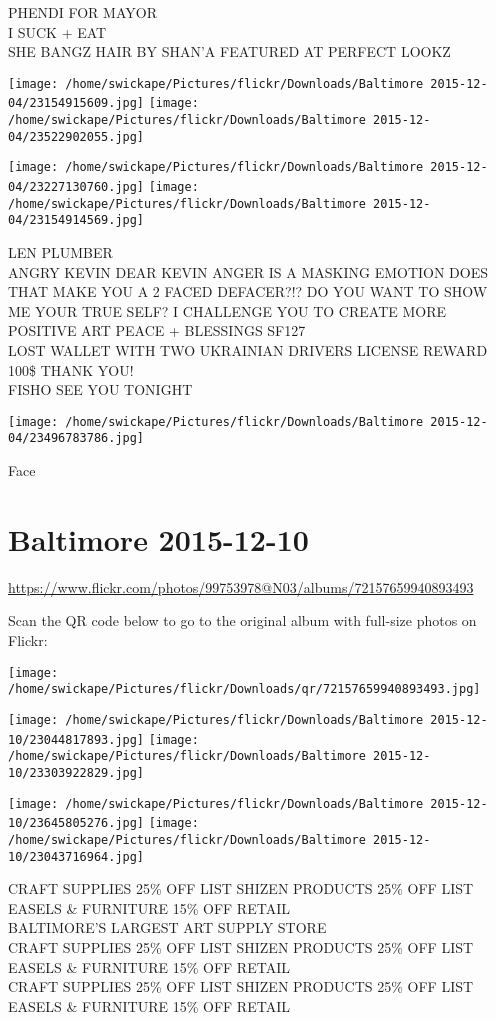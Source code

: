 \documentclass[10pt,letterpaper]{article}
\begin{document}
PHENDI FOR MAYOR\\
I SUCK + EAT\\
SHE BANGZ HAIR BY SHAN'A FEATURED AT PERFECT LOOKZ
\pagebreak

\texttt{[image: /home/swickape/Pictures/flickr/Downloads/Baltimore 2015-12-04/23154915609.jpg]}
\texttt{[image: /home/swickape/Pictures/flickr/Downloads/Baltimore 2015-12-04/23522902055.jpg]}

\texttt{[image: /home/swickape/Pictures/flickr/Downloads/Baltimore 2015-12-04/23227130760.jpg]}
\texttt{[image: /home/swickape/Pictures/flickr/Downloads/Baltimore 2015-12-04/23154914569.jpg]}

LEN PLUMBER\\
ANGRY KEVIN DEAR KEVIN ANGER IS A MASKING EMOTION DOES THAT MAKE YOU A 2 FACED DEFACER?!?  DO YOU WANT TO SHOW ME YOUR TRUE SELF?  I CHALLENGE YOU TO CREATE MORE POSITIVE ART PEACE + BLESSINGS SF127\\
LOST WALLET WITH TWO UKRAINIAN DRIVERS LICENSE REWARD 100\$ THANK YOU!\\
FISHO SEE YOU TONIGHT
\pagebreak

\texttt{[image: /home/swickape/Pictures/flickr/Downloads/Baltimore 2015-12-04/23496783786.jpg]}

Face
\pagebreak

\section*{Baltimore 2015-12-10}

\url{https://www.flickr.com/photos/99753978@N03/albums/72157659940893493}

Scan the QR code below to go to the original album with full-size photos on Flickr:

\texttt{[image: /home/swickape/Pictures/flickr/Downloads/qr/72157659940893493.jpg]}
\pagebreak

\texttt{[image: /home/swickape/Pictures/flickr/Downloads/Baltimore 2015-12-10/23044817893.jpg]}
\texttt{[image: /home/swickape/Pictures/flickr/Downloads/Baltimore 2015-12-10/23303922829.jpg]}

\texttt{[image: /home/swickape/Pictures/flickr/Downloads/Baltimore 2015-12-10/23645805276.jpg]}
\texttt{[image: /home/swickape/Pictures/flickr/Downloads/Baltimore 2015-12-10/23043716964.jpg]}

CRAFT SUPPLIES 25\% OFF LIST SHIZEN PRODUCTS 25\% OFF LIST EASELS \& FURNITURE 15\% OFF RETAIL\\
BALTIMORE'S LARGEST ART SUPPLY STORE\\
CRAFT SUPPLIES 25\% OFF LIST SHIZEN PRODUCTS 25\% OFF LIST EASELS \& FURNITURE 15\% OFF RETAIL\\
CRAFT SUPPLIES 25\% OFF LIST SHIZEN PRODUCTS 25\% OFF LIST EASELS \& FURNITURE 15\% OFF RETAIL
\pagebreak
\end{document}
